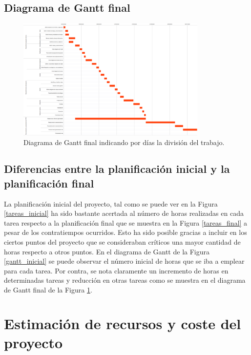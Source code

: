 \documentclass[pdftex,11pt,a4paper]{book}
\begin{document}
\subsection{Diagrama de Gantt final}

\begin{figure}[H]
\begin{center}
\includegraphics[angle=90,width=0.84\textwidth]{img/gantt_final.png}
\caption{\label{gantt_final}Diagrama de Gantt final indicando por días la división del trabajo.}
\end{center}
\end{figure}

\subsection{Diferencias entre la planificación inicial y la planificación final}

La planificación inicial del proyecto, tal como se puede ver en la Figura \ref{tareas_inicial} ha sido bastante acertada al número de horas realizadas en cada tarea respecto a la planificación final que se muestra en la Figura \ref{tareas_final} a pesar de los contratiempos ocurridos. Esto ha sido posible gracias a incluir en los ciertos puntos del proyecto que se consideraban críticos una mayor cantidad de horas respecto a otros puntos. En el diagrama de Gantt de la Figura \ref{gantt_inicial} se puede observar el número inicial de horas que se iba a emplear para cada tarea. Por contra, se nota claramente un incremento de horas en determinadas tareas y reducción en otras tareas como se muestra en el diagrama de Gantt final de la Figura \ref{gantt_final}.

\section{Estimación de recursos y coste del proyecto}
\end{document}
